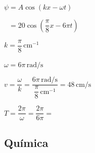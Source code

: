 \begin{enumerate}[resume]
		$\psi = A \cos(kx - \omega t)$

		$\phantom{\psi} = 20 \cos\left(\dfrac{\pi}{8}x - 6\pi t\right)$


		$k = \dfrac{\pi}{8} \, \text{cm}^{-1}$

		$\omega = 6\pi \, \text{rad/s}$

		$v = \dfrac{\omega}{k} = \dfrac{6\pi \, \text{rad/s}}{\dfrac{\pi}{8} \, \text{cm}^{-1}} = 48 \, \text{cm/s}$

		$T = \dfrac{2\pi}{\omega} = \dfrac{2\pi}{6\pi} =$ 

	\vspace{6mm}













\end{enumerate}


\subsection*{Química}

